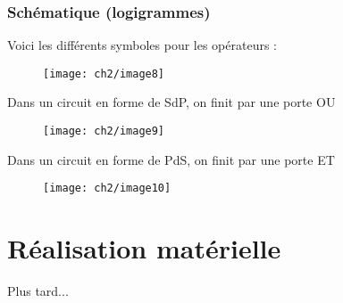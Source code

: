\subsubsection{Schématique (logigrammes)}
Voici les différents symboles pour les opérateurs :
\begin{figure}[H]
	\centering
	\texttt{[image: ch2/image8]}
\end{figure}
Dans un circuit en forme de SdP, on finit par une porte OU
\begin{figure}[H]
	\centering
	\texttt{[image: ch2/image9]}
\end{figure}
Dans un circuit en forme de PdS, on finit par une porte ET
\begin{figure}[H]
	\centering
	\texttt{[image: ch2/image10]}
\end{figure}
\section{Réalisation matérielle}
Plus tard...